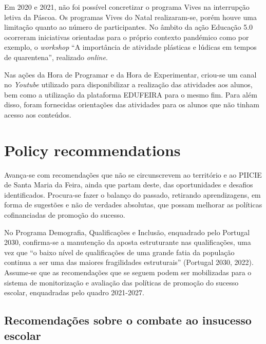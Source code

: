 \documentclass[
]{book}
\begin{document}
Em 2020 e 2021, não foi possível concretizar o programa Vives na interrupção letiva da Páscoa. Os programas Vives do Natal realizaram-se, porém houve uma limitação quanto ao número de participantes. No âmbito da ação Educação 5.0 ocorreram iniciativas orientadas para o próprio contexto pandémico como por exemplo, o \emph{workshop} ``A importância de atividade plásticas e lúdicas em tempos de quarentena'', realizado \emph{online}.

Nas ações da Hora de Programar e da Hora de Experimentar, criou-se um canal no \emph{Youtube} utilizado para disponibilizar a realização das atividades aos alunos, bem como a utilização da plataforma EDUFEIRA para o mesmo fim. Para além disso, foram fornecidas orientações das atividades para os alunos que não tinham acesso aos conteúdos.

\hypertarget{policy-recommendations}{%
\chapter{\texorpdfstring{\textbf{Policy recommendations}}{Policy recommendations}}\label{policy-recommendations}}

Avança-se com recomendações que não se circunscrevem ao território e ao PIICIE de Santa Maria da Feira, ainda que partam deste, das oportunidades e desafios identificados. Procura-se fazer o balanço do passado, retirando aprendizagens, em forma de sugestões e não de verdades absolutas, que possam melhorar as políticas cofinanciadas de promoção do sucesso.

No Programa Demografia, Qualificações e Inclusão, enquadrado pelo Portugal 2030, confirma-se a manutenção da aposta estruturante nas qualificações, uma vez que ``o baixo nível de qualificações de uma grande fatia da população continua a ser uma das maiores fragilidades estruturais'' (Portugal 2030, 2022). Assume-se que as recomendações que se seguem podem ser mobilizadas para o sistema de monitorização e avaliação das políticas de promoção do sucesso escolar, enquadradas pelo quadro 2021-2027.

\hypertarget{recomendauxe7uxf5es-sobre-o-combate-ao-insucesso-escolar}{%
\section{\texorpdfstring{\textbf{Recomendações sobre o combate ao insucesso escolar}}{Recomendações sobre o combate ao insucesso escolar}}\label{recomendauxe7uxf5es-sobre-o-combate-ao-insucesso-escolar}}
\end{document}
